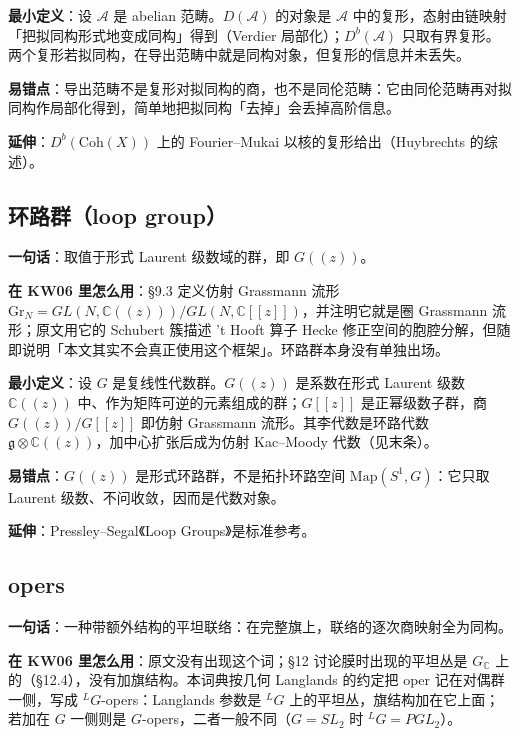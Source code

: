 \textbf{最小定义}：设 $\mathcal A$ 是 abelian 范畴。$D(\mathcal A)$ 的对象是 $\mathcal A$ 中的复形，态射由链映射「把拟同构形式地变成同构」得到（Verdier 局部化）；$D^b(\mathcal A)$ 只取有界复形。两个复形若拟同构，在导出范畴中就是同构对象，但复形的信息并未丢失。

\textbf{易错点}：导出范畴不是复形对拟同构的商，也不是同伦范畴：它由同伦范畴再对拟同构作局部化得到，简单地把拟同构「去掉」会丢掉高阶信息。

\textbf{延伸}：$D^b(\mathrm{Coh}(X))$ 上的 Fourier--Mukai 以核的复形给出（Huybrechts 的综述）。

\subsection{环路群（loop group）}

\textbf{一句话}：取值于形式 Laurent 级数域的群，即 $G(\!(z)\!)$。

\textbf{在 KW06 里怎么用}：§9.3 定义仿射 Grassmann 流形 $\mathrm{Gr}_N=GL(N,\mathbb C(\!(z)\!))/GL(N,\mathbb C[[z]])$，并注明它就是圈 Grassmann 流形；原文用它的 Schubert 簇描述 't Hooft 算子 Hecke 修正空间的胞腔分解，但随即说明「本文其实不会真正使用这个框架」。环路群本身没有单独出场。

\textbf{最小定义}：设 $G$ 是复线性代数群。$G(\!(z)\!)$ 是系数在形式 Laurent 级数 $\mathbb C(\!(z)\!)$ 中、作为矩阵可逆的元素组成的群；$G[[z]]$ 是正幂级数子群，商 $G(\!(z)\!)/G[[z]]$ 即仿射 Grassmann 流形。其李代数是环路代数 $\mathfrak g\otimes\mathbb C(\!(z)\!)$，加中心扩张后成为仿射 Kac--Moody 代数（见末条）。

\textbf{易错点}：$G(\!(z)\!)$ 是形式环路群，不是拓扑环路空间 $\mathrm{Map}(S^1,G)$：它只取 Laurent 级数、不问收敛，因而是代数对象。

\textbf{延伸}：Pressley--Segal《Loop Groups》是标准参考。

\subsection{opers}

\textbf{一句话}：一种带额外结构的平坦联络：在完整旗上，联络的逐次商映射全为同构。

\textbf{在 KW06 里怎么用}：原文没有出现这个词；§12 讨论膜时出现的平坦丛是 $G_{\mathbb C}$ 上的（§12.4），没有加旗结构。本词典按几何 Langlands 的约定把 oper 记在对偶群一侧，写成 ${}^L G$-opers：Langlands 参数是 ${}^L G$ 上的平坦丛，旗结构加在它上面；若加在 $G$ 一侧则是 $G$-opers，二者一般不同（$G=SL_2$ 时 ${}^L G=PGL_2$）。

